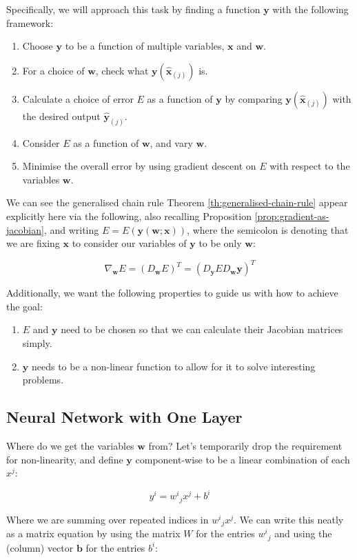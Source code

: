 \documentclass[a4paper]{article}
\theoremstyle{plain} %
\theoremstyle{definition} %
\numberwithin{equation}{subsection}
\newcommand{\vx}{{\textbf{x}}}
\newcommand{\vy}{{\textbf{y}}}
\newcommand{\vw}{{\textbf{w}}}
\newcommand{\vb}{{\textbf{b}}}
\newcommand{\vxh}{{\widehat{\textbf{x}}}}
\newcommand{\vyh}{{\widehat{\textbf{y}}}}
\begin{document}
Specifically, we will approach this task by finding a function $\vy$ with the following framework:

\begin{enumerate}
  \item Choose $\vy$ to be a function of multiple variables, $\vx$ and $\vw$.
  \item For a choice of $\vw$, check what $\vy(\vxh_{(j)})$ is.
  \item Calculate a choice of error $E$ as a function of $\vy$ by comparing
  $\vy(\vxh_{(j)})$ with the desired output $\vyh_{(j)}$.
  \item Consider $E$ as a function of $\vw$, and vary $\vw$.
  \item Minimise the overall error by using gradient descent on $E$ with respect to the variables $\vw$.
\end{enumerate}

We can see the generalised chain rule Theorem \ref{th:generalised-chain-rule} appear explicitly here via the following, also recalling Proposition \ref{prop:gradient-as-jacobian}, 
and writing $E = E(\vy(\vw; \vx))$, where the semicolon is denoting that we are fixing $\vx$ to consider our variables of $\vy$ to be only $\vw$:

\[ \nabla_\vw E = (D_\vw E)^T = (D_\vy E D_\vw \vy)^T \]

Additionally, we want the following properties to guide us with how to achieve the goal:

\begin{enumerate}
  \item $E$ and $\vy$ need to be chosen so that we can calculate their Jacobian matrices simply.
  \item $\vy$ needs to be a non-linear function to allow for it to solve interesting problems.
\end{enumerate}

\subsection{Neural Network with One Layer}

Where do we get the variables $\vw$ from? Let's temporarily drop the requirement for non-linearity, and define 
$\vy$ component-wise to be a linear combination of each $x^j$:

\[ y^i = {w^i}_j x^j + b^i \]

Where we are summing over repeated indices in ${w^i}_j x^j $. 
We can write this neatly as a matrix equation by using the matrix $W$ for the entries ${w^i}_j$ and using the (column) vector $\vb$ for the entries $b^i$:
\end{document}
